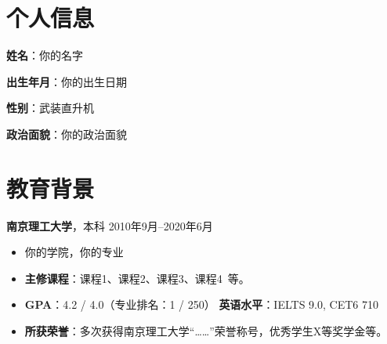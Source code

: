 \documentclass[11pt]{article}
\newlength{\iconwidth}
\begin{document}
    \begin{minipage}[t]{0.78\textwidth}
        \begin{minipage}[t]{\textwidth}
        \section[个人信息]{\quad 个人信息}
        \begin{minipage}[t]{0.5\textwidth}
            \textbf{姓\qquad 名}：你的名字
            
            \vspace{0.5em}
            \textbf{出生年月}：你的出生日期
        \end{minipage}
        \begin{minipage}[t]{0.35\textwidth}
            \textbf{性\qquad 别}：武装直升机
            
            \vspace{0.5em}
            \textbf{政治面貌}：你的政治面貌
        \end{minipage}
        \vspace{1.2em}
        \end{minipage}

        \begin{minipage}[t]{\textwidth}
        \section[教育背景]{\quad 教育背景}
        

        \vspace{0.5em}
        {\large \textbf{南京理工大学}}，本科 \hfill 2010年9月--2020年6月
        \begin{itemize}
            \item 你的学院，你的专业
            \item \textbf{主修课程}：课程1、课程2、课程3、课程4\ 等。
            \item \textbf{GPA}：4.2 / 4.0（专业排名：1 / 250） \qquad \qquad \qquad \textbf{英语水平}：IELTS 9.0, CET6 710
            \item \textbf{所获荣誉}：多次获得南京理工大学“……”荣誉称号，优秀学生X等奖学金等。
        \end{itemize}
        

\end{minipage}
\end{minipage}
\end{document}
